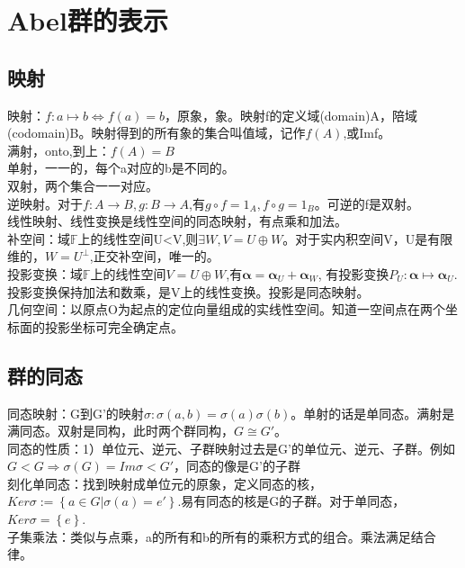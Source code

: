 \section{Abel群的表示}
\subsection{映射}
映射：$f:a \mapsto b \Leftrightarrow f(a)=b$，原象，象。映射f的定义域(domain)A，陪域(codomain)B。映射得到的所有象的集合叫值域，记作$f(A)$,或Imf。\\
满射，onto,到上：$f(A)=B$\\
单射，一一的，每个a对应的b是不同的。\\
双射，两个集合一一对应。\\
逆映射。对于$f:A \to B, g: B \to A$,有$g \circ f =1_A, f \circ g =1_B$。可逆的f是双射。\\

线性映射、线性变换是线性空间的同态映射，有点乘和加法。\\
补空间：域$\mathbb F$上的线性空间U<V,则$\exists W, V=U \oplus W$。对于实内积空间V，U是有限维的，$W=U^{\perp}$,正交补空间，唯一的。\\
投影变换：域$\mathbb F$上的线性空间$V=U \oplus W$,有$\mathbf \alpha =\mathbf \alpha _U+\mathbf \alpha _W$, 有投影变换$P_U:\mathbf \alpha \mapsto \mathbf \alpha _U$.投影变换保持加法和数乘，是V上的线性变换。投影是同态映射。\\
几何空间：以原点O为起点的定位向量组成的实线性空间。知道一空间点在两个坐标面的投影坐标可完全确定点。

\subsection{群的同态}
同态映射：G到G'的映射$\sigma: \sigma(a,b)=\sigma(a) \sigma(b)$。单射的话是单同态。满射是满同态。双射是同构，此时两个群同构，$G \cong G'$。\\
同态的性质：1）单位元、逆元、子群映射过去是G’的单位元、逆元、子群。例如$G<G \Rightarrow \sigma(G)=Im\sigma <G'$，同态的像是G'的子群\\
刻化单同态：找到映射成单位元的原象，定义同态的核，$Ker\sigma:=\left\{ a \in G | \sigma(a)=e' \right\}$.易有同态的核是G的子群。对于单同态，$Ker\sigma=\left\{ e \right\}$.\\
子集乘法：类似与点乘，a的所有和b的所有的乘积方式的组合。乘法满足结合律。\\

